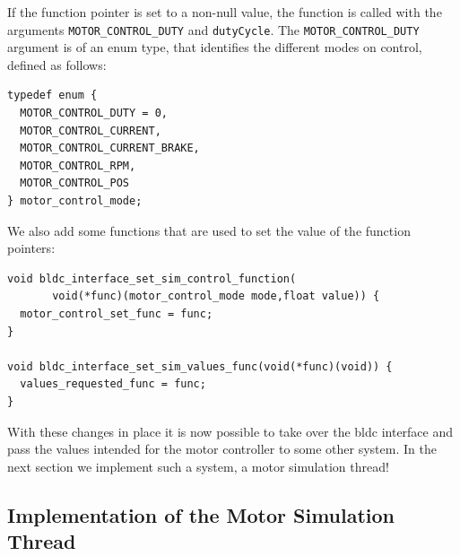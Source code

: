 \documentclass[12pt]{article} %
\begin{document}
If the function pointer is set to a non-null value, the function is
called with the arguments \verb!MOTOR_CONTROL_DUTY! and
\verb!dutyCycle!. The \verb!MOTOR_CONTROL_DUTY! argument is of an enum
type, that identifies the different modes on control, defined as
follows:

\begin{Verbatim}[samepage=true, frame=single, label=Embedded/RC\_Controller/datatypes.h]
typedef enum {
  MOTOR_CONTROL_DUTY = 0,
  MOTOR_CONTROL_CURRENT,
  MOTOR_CONTROL_CURRENT_BRAKE,
  MOTOR_CONTROL_RPM,
  MOTOR_CONTROL_POS
} motor_control_mode;
\end{Verbatim}


We also add some functions that are used to set the value of the
function pointers: 

\begin{Verbatim}[samepage=true, frame=single, label=Embedded/RC\_Controller/bldc\_interface.c]
void bldc_interface_set_sim_control_function(
       void(*func)(motor_control_mode mode,float value)) {
  motor_control_set_func = func;
}

void bldc_interface_set_sim_values_func(void(*func)(void)) {
  values_requested_func = func;
}
\end{Verbatim}

With these changes in place it is now possible to take over the bldc interface
and pass the values intended for the motor controller to some other system.
In the next section we implement such a system, a motor simulation thread!

\subsection{Implementation of the Motor Simulation Thread}\label{sec:simthread}
\end{document}

